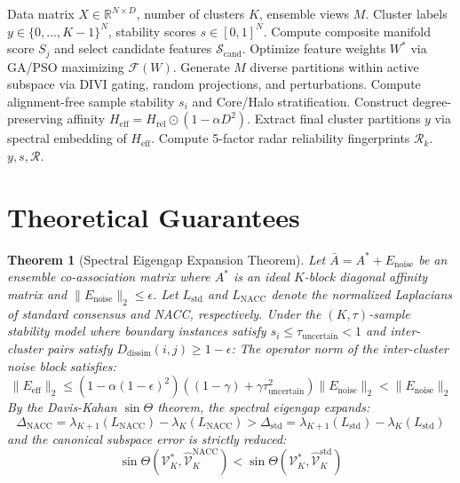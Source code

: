 \documentclass[journal]{IEEEtran}
\newtheorem{theorem}{Theorem}
\begin{document}
\begin{algorithm}[t]
\caption{Noise-Aware Consensus Clustering (NACC)}
\begin{algorithmic}[1]
\REQUIRE Data matrix $X \in \mathbb{R}^{N \times D}$, number of clusters $K$, ensemble views $M$.
\ENSURE Cluster labels $y \in \{0, \dots, K-1\}^N$, stability scores $s \in [0, 1]^N$.
\STATE Compute composite manifold score $S_j$ and select candidate features $\mathcal{S}_{\text{cand}}$.
\STATE Optimize feature weights $W^*$ via GA/PSO maximizing $\mathcal{F}(W)$.
\STATE Generate $M$ diverse partitions within active subspace via DIVI gating, random projections, and perturbations.
\STATE Compute alignment-free sample stability $s_i$ and Core/Halo stratification.
\STATE Construct degree-preserving affinity $H_{\text{eff}} = H_{\text{rel}} \odot (1 - \alpha D^2)$.
\STATE Extract final cluster partitions $y$ via spectral embedding of $H_{\text{eff}}$.
\STATE Compute 5-factor radar reliability fingerprints $\mathcal{R}_k$.
\RETURN $y, s, \mathcal{R}$.
\end{algorithmic}
\end{algorithm}

\section{Theoretical Guarantees}

\begin{theorem}[Spectral Eigengap Expansion Theorem]
Let $\bar{A} = A^* + E_{\text{noise}}$ be an ensemble co-association matrix where $A^*$ is an ideal $K$-block diagonal affinity matrix and $\|E_{\text{noise}}\|_2 \le \epsilon$. Let $L_{\text{std}}$ and $L_{\text{NACC}}$ denote the normalized Laplacians of standard consensus and NACC, respectively.
Under the $(K, \tau)$-sample stability model where boundary instances satisfy $s_i \le \tau_{\text{uncertain}} < 1$ and inter-cluster pairs satisfy $D_{\text{dissim}}(i, j) \ge 1 - \epsilon$:
The operator norm of the inter-cluster noise block satisfies:
\begin{equation}
\|E_{\text{eff}}\|_2 \le (1 - \alpha (1 - \epsilon)^2) \left((1 - \gamma) + \gamma \tau_{\text{uncertain}}^2\right) \|E_{\text{noise}}\|_2 < \|E_{\text{noise}}\|_2
\end{equation}
By the Davis-Kahan $\sin \Theta$ theorem, the spectral eigengap expands:
\begin{equation}
\Delta_{\text{NACC}} = \lambda_{K+1}(L_{\text{NACC}}) - \lambda_K(L_{\text{NACC}}) > \Delta_{\text{std}} = \lambda_{K+1}(L_{\text{std}}) - \lambda_K(L_{\text{std}})
\end{equation}
and the canonical subspace error is strictly reduced:
\begin{equation}
\sin \Theta(\mathcal{V}_K^*, \hat{\mathcal{V}}_K^{\text{NACC}}) < \sin \Theta(\mathcal{V}_K^*, \hat{\mathcal{V}}_K^{\text{std}})
\end{equation}
\end{theorem}
\end{document}
